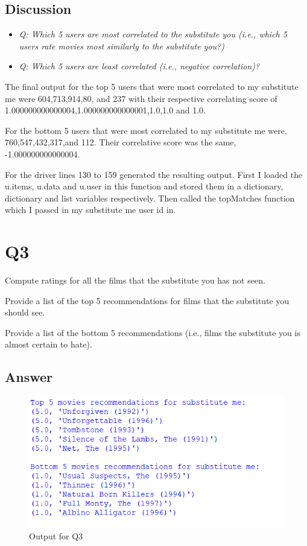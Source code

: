\documentclass[12pt]{article}
\begin{document}
\subsection*{Discussion}
\begin{itemize}
    \item \emph{Q: Which 5 users are most correlated to the substitute you (i.e., which 5 users rate movies most similarly to the substitute you?)}
    \item \emph{Q: Which 5 users are least correlated (i.e., negative correlation)?}
\end{itemize}
The final output for the top 5 users that were most correlated to my substitute me were
604,713,914,80, and 237 with their respective correlating score of 1.000000000000004,1.000000000000001,1.0,1.0 and 1.0.

For the bottom 5 users that were most correlated to my substitute me were, 760,547,432,317,and 112. Their correlative score was the same, -1.000000000000004.

For the driver lines 130 to 159 generated the resulting output. First I loaded the u.items, u.data and u.user in this function and stored them in a dictionary, dictionary and list variables respectively. Then called the topMatches function which I passed in my substitute me user id in.

\section*{Q3}
Compute ratings for all the films that the substitute you has not seen.

Provide a list of the top 5 recommendations for films that the substitute you should see.

Provide a list of the bottom 5 recommendations (i.e., films the substitute you is almost certain to hate).

\subsection*{Answer}
\begin{figure}[h]
    \centering
    \includegraphics[trim=0 0 0 0, clip, width=\textwidth] {Capture2.PNG}
    \caption{Output for Q3}
    \label{fig2}
\end{figure}
\end{document}
